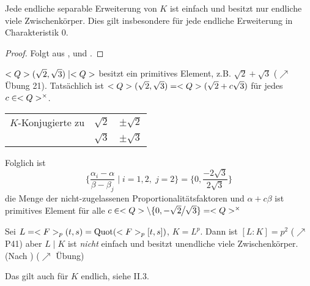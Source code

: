 \begin{conclusion}
	Jede endliche separable Erweiterung von $K$ ist einfach und besitzt nur endliche viele Zwischenkörper. Dies gilt insbesondere für jede endliche Erweiterung in Charakteristik 0.
\end{conclusion}
\begin{proof}
	Folgt aus ,  und .
\end{proof}
\begin{example}
	$\Q(\sqrt{2}, \sqrt{3})\mid \Q$ besitzt ein primitives Element, z.B. $\sqrt{2} + \sqrt{3}$ ($\nearrow$ Übung 21). Tatsächlich ist $\Q(\sqrt{2}, \sqrt{3}) = \Q(\sqrt{2}+c\sqrt{3})$ für jedes $c \in \Q^{\times}$.
	
	\begin{tabular}{@{}l@{ }l@{: }l}
		$K$-Konjugierte zu & $\sqrt 2$ & $\pm\sqrt 2$\\[-0.7em]
						   & $\sqrt{3}$ & $\pm \sqrt3$
	\end{tabular}

	Folglich ist \begin{equation*}
		\Bigg\lbrace \frac{\alpha_i - \alpha}{\beta-\beta_j} \;\Bigg|\; i = 1,2,\;j = 2\Bigg\rbrace = \bigg\lbrace 0, \frac{-2\sqrt{3}}{2\sqrt{3}}\bigg\rbrace
	\end{equation*}
	die Menge der nicht-zugelassenen Proportionalitätsfaktoren und $\alpha + c\beta$ ist primitives Element für alle $c\in \mathbb Q\setminus \lbrace 0, -\sqrt{2}\mskip-1mu\big\slash\mskip-1mu\sqrt3\rbrace = \mathbb Q^\times$
\end{example}
\begin{example}
	Sei $L = \F_p(t,s) = \Quot(\F_p[t,s])$, $K = L^p$. Dann ist $[L:K] = p^2$ ($\nearrow$ P41) aber $L\mid K$ ist \emph{nicht} einfach und besitzt unendliche viele Zwischenkörper. (Nach ) ($\nearrow$ Übung)
\end{example}
\begin{remark}
	Das  gilt auch für $K$ endlich, siehe II.3. %
\end{remark}